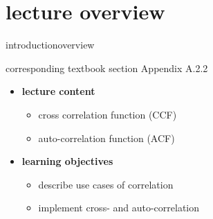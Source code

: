 


\subtitle{Module A.2.2: Fundamentals~---~Correlation}


	

    \section[overview]{lecture overview}
        \begin{frame}{introduction}{overview}
            \begin{block}{corresponding textbook section}
                    Appendix A.2.2
            \end{block}

            \begin{itemize}
                \item   \textbf{lecture content}
                    \begin{itemize}
                        \item   cross correlation function (CCF)
                        \item   auto-correlation function (ACF)
                    \end{itemize}
                \bigskip
                \item<2->   \textbf{learning objectives}
                    \begin{itemize}
                        \item   describe use cases of correlation
                        \item   implement cross- and auto-correlation
                    \end{itemize}
            \end{itemize}
        \end{frame}

